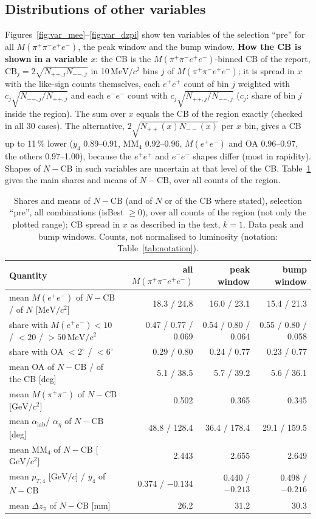 \documentclass[11pt,a4paper]{article}
\newcommand{\Mfour}{\ensuremath{M(\pi^{+}\pi^{-}e^{+}e^{-})}\xspace}
\newcommand{\Mee}{\ensuremath{M(e^{+}e^{-})}\xspace}
\newcommand{\Mpipi}{\ensuremath{M(\pi^{+}\pi^{-})}\xspace}
\newcommand{\GeVc}{\ensuremath{\mathrm{GeV}/c}\xspace}
\newcommand{\GeVcc}{\ensuremath{\mathrm{GeV}/c^{2}}\xspace}
\newcommand{\MeVcc}{\ensuremath{\mathrm{MeV}/c^{2}}\xspace}
\newcommand{\MMfour}{\ensuremath{\mathrm{MM}_4}\xspace}
\newcommand{\dzpi}{\ensuremath{\Delta z_\pi}\xspace}
\newcommand{\alab}{\ensuremath{\alpha_{\mathrm{lab}}}\xspace}
\newcommand{\aeta}{\ensuremath{\alpha_\eta}\xspace}
\begin{document}
\subsection{Distributions of other variables}
\label{sec:vars}
Figures~\ref{fig:var_mee}--\ref{fig:var_dzpi} show ten variables of the selection ``pre'' for all \Mfour, the peak
window and the bump window. \textbf{How the CB is shown in a variable $x$}: the CB is the \Mfour-binned CB of the
report, $\mathrm{CB}_j=2\sqrt{N_{++,j}N_{--,j}}$ in 10\,\MeVcc bins $j$ of \Mfour; it is spread in $x$ with the
like-sign counts themselves, each $e^+e^+$ count of bin $j$ weighted with $c_j\sqrt{N_{--,j}/N_{++,j}}$ and each
$e^-e^-$ count with $c_j\sqrt{N_{++,j}/N_{--,j}}$ ($c_j$: share of bin $j$ inside the region). The sum over $x$
equals the CB of the region exactly (checked in all 30 cases). The alternative, $2\sqrt{N_{++}(x)N_{--}(x)}$ per
$x$ bin, gives a CB up to 11\,\% lower ($y_4$ 0.89--0.91, \MMfour 0.92--0.96, \Mee and OA 0.96--0.97, the
others 0.97--1.00), because the $e^+e^+$ and $e^-e^-$ shapes differ (most in rapidity). Shapes of
$N-\mathrm{CB}$ in such variables are uncertain at that level of the CB. Table~\ref{tab:means} gives the main
shares and means of $N-\mathrm{CB}$, over all counts of the region.

\begin{table}[H]
\centering
\caption{Shares and means of $N-\mathrm{CB}$ (and of $N$ or of the CB where stated), selection ``pre'', all
combinations (isBest $\ge0$), over all counts of the region (not only the plotted range); CB spread in $x$ as
described in the text, $k=1$. Data peak and bump windows. Counts, not normalised to luminosity (notation:
Table~\ref{tab:notation}).}
\label{tab:means}
\small
\setlength{\tabcolsep}{4pt}
\begin{tabularx}{\textwidth}{@{}L r r r@{}}
\toprule
Quantity & all \Mfour & peak window & bump window \\
\midrule
mean \Mee of $N-\mathrm{CB}$ / of $N$ [\MeVcc] & 18.3 / 24.8 & 16.0 / 23.1 & 15.4 / 21.3 \\
share with \Mee $<10$ / $<20$ / $>50$\,\MeVcc & 0.47 / 0.77 / 0.069 & 0.54 / 0.80 / 0.064 & 0.55 / 0.80 / 0.058 \\
share with OA $<2^\circ$ / $<6^\circ$ & 0.29 / 0.80 & 0.24 / 0.77 & 0.23 / 0.77 \\
mean OA of $N-\mathrm{CB}$ / of the CB [deg] & 5.1 / 38.5 & 5.7 / 39.2 & 5.6 / 36.1 \\
mean \Mpipi of $N-\mathrm{CB}$ [\GeVcc] & 0.502 & 0.365 & 0.345 \\
mean \alab / \aeta of $N-\mathrm{CB}$ [deg] & 48.8 / 128.4 & 36.4 / 178.4 & 29.1 / 159.5 \\
mean \MMfour of $N-\mathrm{CB}$ [\GeVcc] & 2.443 & 2.655 & 2.649 \\
mean $p_{T,4}$ [\GeVc] / $y_4$ of $N-\mathrm{CB}$ & 0.374 / $-0.134$ & 0.440 / $-0.213$ & 0.498 / $-0.216$ \\
mean \dzpi of $N-\mathrm{CB}$ [mm] & 26.2 & 31.2 & 30.3 \\
\bottomrule
\end{tabularx}
\end{table}
\end{document}
